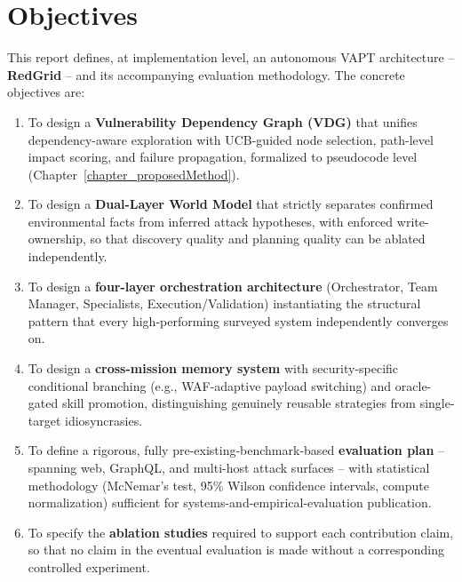 

\section{Objectives}
\label{sec:intro_objectives}

This report defines, at implementation level, an autonomous VAPT architecture -- \textbf{RedGrid} -- and its accompanying evaluation methodology. The concrete objectives are:

\begin{enumerate}
    \item To design a \textbf{Vulnerability Dependency Graph (VDG)} that unifies dependency-aware exploration with UCB-guided node selection, path-level impact scoring, and failure propagation, formalized to pseudocode level (Chapter~\ref{chapter_proposedMethod}).
    \item To design a \textbf{Dual-Layer World Model} that strictly separates confirmed environmental facts from inferred attack hypotheses, with enforced write-ownership, so that discovery quality and planning quality can be ablated independently.
    \item To design a \textbf{four-layer orchestration architecture} (Orchestrator, Team Manager, Specialists, Execution/Validation) instantiating the structural pattern that every high-performing surveyed system independently converges on.
    \item To design a \textbf{cross-mission memory system} with security-specific conditional branching (e.g., WAF-adaptive payload switching) and oracle-gated skill promotion, distinguishing genuinely reusable strategies from single-target idiosyncrasies.
    \item To define a rigorous, fully pre-existing-benchmark-based \textbf{evaluation plan} -- spanning web, GraphQL, and multi-host attack surfaces -- with statistical methodology (McNemar's test, 95\% Wilson confidence intervals, compute normalization) sufficient for systems-and-empirical-evaluation publication.
    \item To specify the \textbf{ablation studies} required to support each contribution claim, so that no claim in the eventual evaluation is made without a corresponding controlled experiment.
\end{enumerate}
